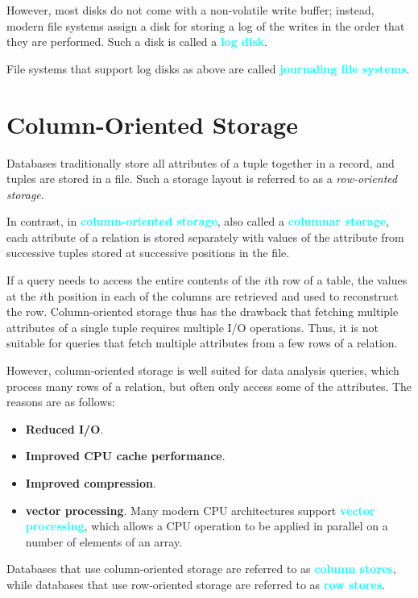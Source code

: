 \documentclass[a4paper,12pt,twoside,openany]{book}
\newcommand{\textcy}[1]{\textbf{\textcolor{cyan}{#1}}}
\begin{document}
However, most disks do not come with a non-volatile write buffer; instead, modern file systems assign a disk for storing a log of the writes in the order that they are performed. Such a disk is called a \textcy{log disk}.

File systems that support log disks as above are called \textcy{journaling file systems}.

\section{Column-Oriented Storage}

Databases traditionally store all attributes of a tuple together in a record, and tuples are stored in a file. Such a storage layout is referred to as a \textit{row-oriented storage}.

In contrast, in \textcy{column-oriented storage}, also called a \textcy{columnar storage}, each attribute of a relation is stored separately with values of the attribute from successive tuples stored at successive positions in the file.

If a query needs to access the entire contents of the $i$th row of a table, the values at the $i$th position in each of the columns are retrieved and used to reconstruct the row. Column-oriented storage thus has the drawback that fetching multiple attributes of a single tuple requires multiple I/O operations. Thus, it is not suitable for queries that fetch multiple attributes from a few rows of a relation.

However, column-oriented storage is well suited for data analysis queries, which process many rows of a relation, but often only access some of the attributes. The reasons are as follows:
\begin{itemize}
    \item \textbf{Reduced I/O}.
    \item \textbf{Improved CPU cache performance}.
    \item \textbf{Improved compression}.
    \item \textbf{vector processing}. Many modern CPU architectures support \textcy{vector processing}, which allows a CPU operation to be applied in parallel on a number of elements of an array.
\end{itemize}

Databases that use column-oriented storage are referred to as \textcy{column stores}, while databases that use row-oriented storage are referred to as \textcy{row stores}.
\end{document}
